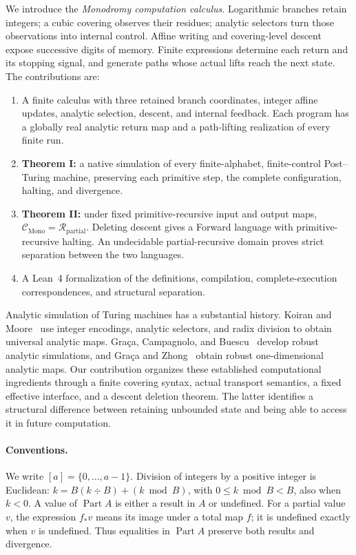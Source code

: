 \documentclass[11pt]{article}
\numberwithin{equation}{section}
\theoremstyle{definition}
\theoremstyle{remark}
\newcommand{\Part}{\operatorname{Part}}
\begin{document}
We introduce the \emph{Monodromy computation calculus}. Logarithmic
branches retain integers; a cubic covering observes their residues;
analytic selectors turn those observations into internal control.
Affine writing and covering-level descent expose successive digits
of memory. Finite expressions determine each return and its stopping
signal, and generate paths whose actual lifts reach the next state.
The contributions are:
\begin{enumerate}
\item A finite calculus with three retained branch coordinates, integer
affine updates, analytic selection, descent, and internal feedback.
Each program has a globally real analytic return map and a path-lifting
realization of every finite run.
\item \textbf{Theorem I:} a native simulation of every finite-alphabet,
finite-control Post--Turing machine, preserving each primitive step,
the complete configuration, halting, and divergence.
\item \textbf{Theorem II:} under fixed primitive-recursive input and
output maps, $\mathcal C_{\mathrm{Mono}}=\mathcal R_{\mathrm{partial}}$.
Deleting descent gives a Forward language with primitive-recursive
halting. An undecidable partial-recursive domain proves strict
separation between the two languages.
\item A Lean~4 formalization of the definitions, compilation,
complete-execution correspondences, and structural separation.
\end{enumerate}

Analytic simulation of Turing machines has a substantial history.
Koiran and Moore~\cite{koiranMoore1999} use integer encodings, analytic
selectors, and radix division to obtain universal analytic maps.
Gra\c ca, Campagnolo, and Buescu~\cite{gracaCampagnoloBuescu2005}
develop robust analytic simulations, and Gra\c ca and
Zhong~\cite{gracaZhong2023} obtain robust one-dimensional analytic maps.
Our contribution organizes these established computational ingredients
through a finite covering syntax, actual transport semantics, a fixed
effective interface, and a descent deletion theorem. The latter
identifies a structural difference between retaining unbounded state
and being able to access it in future computation.

\paragraph{Conventions.}
We write $[a]=\{0,\ldots,a-1\}$. Division of integers by a positive
integer is Euclidean: $k=B(k\div B)+(k\bmod B)$, with
$0\leq k\bmod B<B$, also when $k<0$.
A value of $\Part A$ is either a result in $A$ or undefined. For a
partial value $v$, the expression $f_*v$ means its image under a total map
$f$; it is undefined exactly when $v$ is undefined. Thus equalities in
$\Part A$ preserve both results and divergence.
\end{document}
